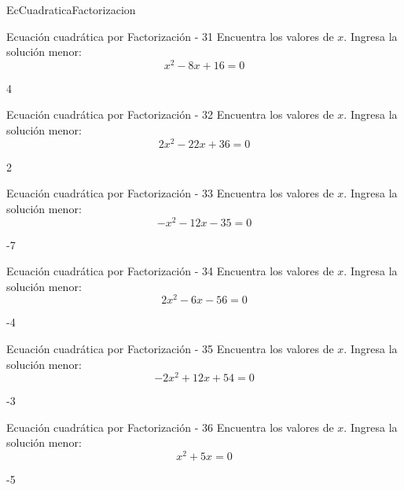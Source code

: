 \documentclass[a4,11pt]{aleph-notas}
\begin{document}
\begin{quiz}{EcCuadraticaFactorizacion}
\begin{numerical}[]%
    {Ecuación cuadrática por Factorización - 31}
    Encuentra los valores de $x$. Ingresa la solución menor:
    \[
        x^{2} - 8 x + 16 = 0
    \]
    \item[] 4
\end{numerical}

\begin{numerical}[]%
    {Ecuación cuadrática por Factorización - 32}
    Encuentra los valores de $x$. Ingresa la solución menor:
    \[
        2 x^{2} - 22 x + 36 = 0
    \]
    \item[] 2
\end{numerical}

\begin{numerical}[]%
    {Ecuación cuadrática por Factorización - 33}
    Encuentra los valores de $x$. Ingresa la solución menor:
    \[
        - x^{2} - 12 x - 35 = 0
    \]
    \item[] -7
\end{numerical}

\begin{numerical}[]%
    {Ecuación cuadrática por Factorización - 34}
    Encuentra los valores de $x$. Ingresa la solución menor:
    \[
        2 x^{2} - 6 x - 56 = 0
    \]
    \item[] -4
\end{numerical}

\begin{numerical}[]%
    {Ecuación cuadrática por Factorización - 35}
    Encuentra los valores de $x$. Ingresa la solución menor:
    \[
        - 2 x^{2} + 12 x + 54 = 0
    \]
    \item[] -3
\end{numerical}

\begin{numerical}[]%
    {Ecuación cuadrática por Factorización - 36}
    Encuentra los valores de $x$. Ingresa la solución menor:
    \[
        x^{2} + 5 x = 0
    \]
    \item[] -5
\end{numerical}


\end{quiz}
\end{document}
